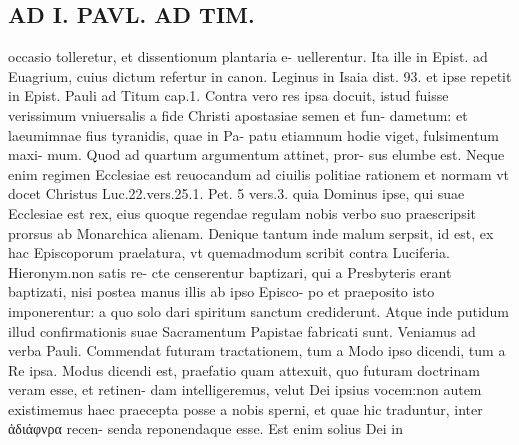 \documentclass{article}
\begin{document}
\begin{pages}
\section*{AD I. PAVL. AD TIM. }
\marginpar{[ p.98 ]}\pstart occasio tolleretur, et dissentionum plantaria e- uellerentur. Ita ille in Epist. ad Euagrium, cuius dictum refertur in canon. Leginus in Isaia dist. 93. et ipse repetit in Epist. Pauli ad Titum cap.1. Contra vero res ipsa docuit, istud fuisse verissimum vniuersalis a fide Christi apostasiae semen et fun- dametum: et laeumimnae fius tyranidis, quae in Pa- patu etiamnum hodie viget, fulsimentum maxi- mum.  \pend\pstart Quod ad quartum argumentum attinet, pror- sus elumbe est. Neque enim regimen Ecclesiae est reuocandum ad ciuilis politiae rationem et normam vt docet Christus Luc.22.vers.25.1. Pet. 5 vers.3. quia Dominus ipse, qui suae Ecclesiae est rex, eius quoque regendae regulam nobis verbo suo praescripsit prorsus ab Monarchica alienam. Denique tantum inde malum serpsit, id est, ex hac Episcoporum praelatura, vt quemadmodum scribit contra Luciferia. Hieronym.non satis re- cte censerentur baptizari, qui a Presbyteris erant baptizati, nisi postea manus illis ab ipso Episco- po et praeposito isto imponerentur: a quo solo dari spiritum sanctum crediderunt. Atque inde putidum illud confirmationis suae Sacramentum Papistae fabricati sunt.  \pend\pstart Veniamus ad verba Pauli. Commendat futuram tractationem, tum a Modo ipso dicendi, tum a Re ipsa. Modus dicendi est, praefatio quam attexuit, quo futuram doctrinam veram esse, et retinen- dam intelligeremus, velut Dei ipsius vocem:non autem existimemus haec praecepta posse a nobis sperni, et quae hic traduntur, inter ἀδιάφνρα recen- senda reponendaque esse. Est enim solius Dei in  \pend

\end{pages}
\end{document}
